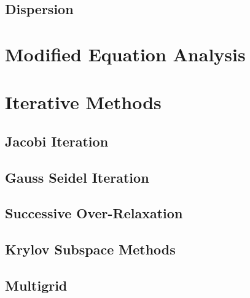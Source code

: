 \section{Dispersion}

\chapter{Modified Equation Analysis}

\chapter{Iterative Methods}
\section{Jacobi Iteration}
\section{Gauss Seidel Iteration}
\section{Successive Over-Relaxation}
\section{Krylov Subspace Methods}
\section{Multigrid}